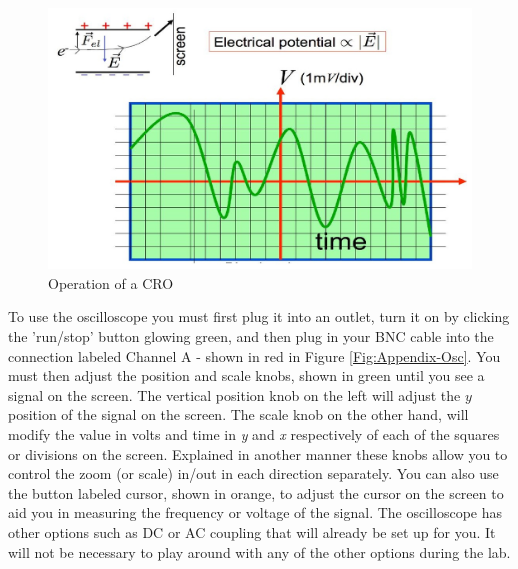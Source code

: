 \documentclass[12pt]{report}
\begin{document}
\begin{appendix}
\begin{figure}[h]
\centering
\includegraphics[scale=1.2]{appendix-cro-data}
\caption{Operation of a CRO}
\label{Fig:Appendix-CRO-data}
\end{figure}

To use the oscilloscope you must first plug it into an outlet, turn it on by clicking the 'run/stop' button glowing green, and then plug in your BNC cable into the connection labeled Channel A - shown in red in Figure \ref{Fig:Appendix-Osc}. You must then adjust the position and scale knobs, shown in green until you see a signal on the screen. The vertical position knob on the left will adjust the $y$ position of the signal on the screen. The scale knob on the other hand, will modify the value in volts and time in \textit{y} and \textit{x} respectively of each of the squares or divisions on the screen. Explained in another manner these knobs allow you to control the zoom (or scale) in/out in each direction separately. You can also use the button labeled cursor, shown in orange, to adjust the cursor on the screen to aid you in measuring the frequency or voltage of the signal. The oscilloscope has other options such as DC or AC coupling that will already be set up for you. It will not be necessary to play around with any of the other options during the lab. 



\end{appendix}
\end{document}
